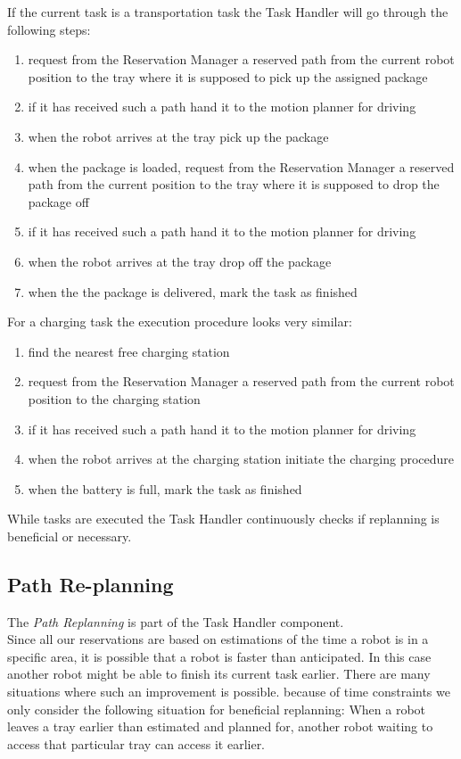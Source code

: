 \documentclass[journal]{IEEEtran}
\begin{document}
If the current task is a transportation task the Task Handler will go through the following steps:
\begin{enumerate}
	\item request from the Reservation Manager a reserved path from the current robot position to the tray where it is supposed to pick up the assigned package
	\item if it has received such a path hand it to the motion planner for driving
	\item when the robot arrives at the tray pick up the package
	\item when the package is loaded, request from the Reservation Manager a reserved path from the current position to the tray where it is supposed to drop the package off
	\item if it has received such a path hand it to the motion planner for driving
	\item when the robot arrives at the tray drop off the package
	\item when the the package is delivered, mark the task as finished
\end{enumerate}
For a charging task the execution procedure looks very similar:
\begin{enumerate}
	\item find the nearest free charging station
	\item request from the Reservation Manager a reserved path from the current robot position to the charging station
	\item if it has received such a path hand it to the motion planner for driving
	\item when the robot arrives at the charging station initiate the charging procedure
	\item when the battery is full, mark the task as finished
\end{enumerate}
While tasks are executed the Task Handler continuously checks if replanning is beneficial or necessary.

\subsection{Path Re-planning}
\label{subsec:path_replanning}
The \textit{Path Replanning} is part of the Task Handler component. \\
Since all our reservations are based on estimations of the time a robot is in a specific area, it is possible that a robot is faster than anticipated. In this case another robot might be able to finish its current task earlier.
There are many situations where such an improvement is possible. 
because of time constraints we only consider the following situation for beneficial replanning:
When a robot leaves a tray earlier than estimated and planned for, another robot waiting to access that particular tray can access it earlier.
\end{document}
